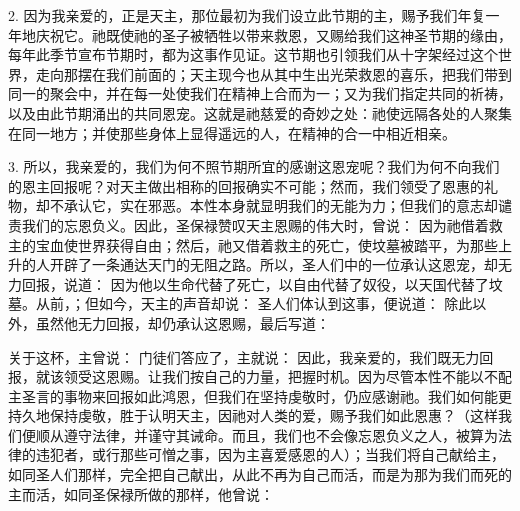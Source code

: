 2. 因为我亲爱的，正是天主，那位最初为我们设立此节期的主，赐予我们年复一年地庆祝它。祂既使祂的圣子被牺牲以带来救恩，又赐给我们这神圣节期的缘由，每年此季节宣布节期时，都为这事作见证。这节期也引领我们从十字架经过这个世界，走向那摆在我们前面的；天主现今也从其中生出光荣救恩的喜乐，把我们带到同一的聚会中，并在每一处使我们在精神上合而为一；又为我们指定共同的祈祷，以及由此节期涌出的共同恩宠。这就是祂慈爱的奇妙之处：祂使远隔各处的人聚集在同一地方；并使那些身体上显得遥远的人，在精神的合一中相近相亲。\par

3. 所以，我亲爱的，我们为何不照节期所宜的感谢这恩宠呢？我们为何不向我们的恩主回报呢？对天主做出相称的回报确实不可能；然而，我们领受了恩惠的礼物，却不承认它，实在邪恶。本性本身就显明我们的无能为力；但我们的意志却谴责我们的忘恩负义。因此，圣保禄赞叹天主恩赐的伟大时，曾说：  因为祂借着救主的宝血使世界获得自由；然后，祂又借着救主的死亡，使坟墓被踏平，为那些上升的人开辟了一条通达天门的无阻之路。所以，圣人们中的一位承认这恩宠，却无力回报，说道： 因为他以生命代替了死亡，以自由代替了奴役，以天国代替了坟墓。从前，；但如今，天主的声音却说： 圣人们体认到这事，便说道： 除此以外，虽然他无力回报，却仍承认这恩赐，最后写道：\par

关于这杯，主曾说： 门徒们答应了，主就说：  因此，我亲爱的，我们既无力回报，就该领受这恩赐。让我们按自己的力量，把握时机。因为尽管本性不能以不配主圣言的事物来回报如此鸿恩，但我们在坚持虔敬时，仍应感谢祂。我们如何能更持久地保持虔敬，胜于认明天主，因祂对人类的爱，赐予我们如此恩惠？（这样我们便顺从遵守法律，并谨守其诫命。而且，我们也不会像忘恩负义之人，被算为法律的违犯者，或行那些可憎之事，因为主喜爱感恩的人）；当我们将自己献给主，如同圣人们那样，完全把自己献出，从此不再为自己而活，而是为那为我们而死的主而活，如同圣保禄所做的那样，他曾说： \par

